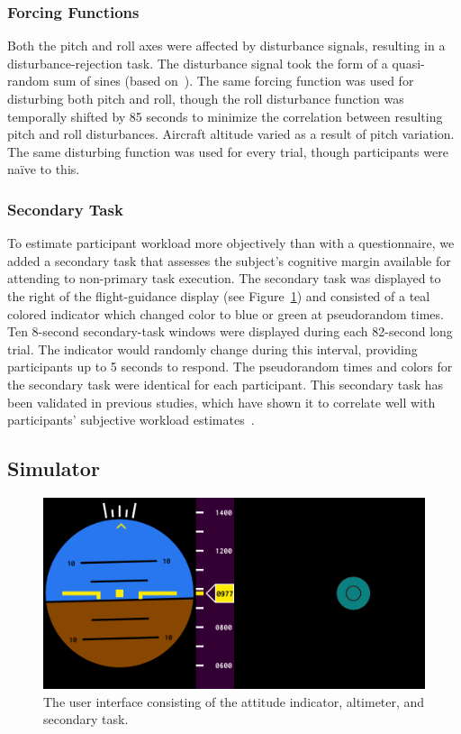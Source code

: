 \subsubsection{Forcing Functions}
Both the pitch and roll axes were affected by disturbance signals, resulting in a disturbance-rejection task.
The disturbance signal took the form of a quasi-random sum of sines (based on~\citet{doi:10.2514/1.39953}).
The same forcing function was used for disturbing both pitch and roll, though the roll disturbance function was temporally shifted by 85 seconds to minimize the correlation between resulting pitch and roll disturbances.
Aircraft altitude varied as a result of pitch variation.
The same disturbing function was used for every trial, though participants were naïve to this.

\subsubsection{Secondary Task}
To estimate participant workload more objectively than with a questionnaire, we added a secondary task that assesses the subject's cognitive margin available for attending to non-primary task execution.
The secondary task was displayed to the right of the flight-guidance display (see Figure~\ref{figure-hfes:userinterface}) and consisted of a teal colored indicator which changed color to blue or green at pseudorandom times.
Ten 8-second secondary-task windows were displayed during each 82-second long trial.
The indicator would randomly change during this interval, providing participants up to 5 seconds to respond.
The pseudorandom times and colors for the secondary task were identical for each participant.
This secondary task has been validated in previous studies, which have shown it to correlate well with participants' subjective workload estimates~\citep{hainley_pilot_2013}.

\subsection{Simulator}
\begin{figure}[b!]
    \begin{center}
        \includegraphics[width=0.8\linewidth]{figures/Aircraft/image1.png}
        \caption[The user interface]{The user interface consisting of the attitude indicator, altimeter, and secondary task.}
        \label{figure-hfes:userinterface}
    \end{center}
\end{figure}

